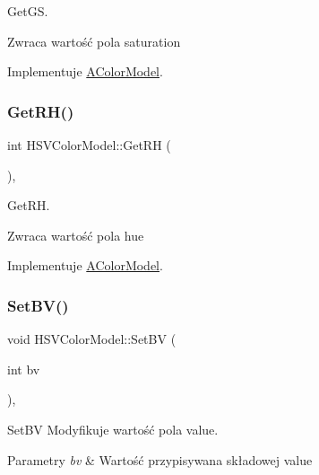 Get\+GS. 

\begin{DoxyReturn}{Zwraca}
wartość pola saturation 
\end{DoxyReturn}


Implementuje \mbox{\hyperlink{class_a_color_model}{A\+Color\+Model}}.

\mbox{\label{class_h_s_v_color_model_aeb9fd06a7806c227ee6a8ad85ee9fbf8}} 
\subsubsection{\texorpdfstring{Get\+R\+H()}{GetRH()}}
{\footnotesize\ttfamily int H\+S\+V\+Color\+Model\+::\+Get\+RH (\begin{DoxyParamCaption}{ }\end{DoxyParamCaption})\hspace{0.3cm}{\ttfamily [override]}, {\ttfamily [virtual]}}



Get\+RH. 

\begin{DoxyReturn}{Zwraca}
wartość pola hue 
\end{DoxyReturn}


Implementuje \mbox{\hyperlink{class_a_color_model}{A\+Color\+Model}}.

\mbox{\label{class_h_s_v_color_model_a4213b3b016d213e791b97438e62c9c1f}} 
\subsubsection{\texorpdfstring{Set\+B\+V()}{SetBV()}}
{\footnotesize\ttfamily void H\+S\+V\+Color\+Model\+::\+Set\+BV (\begin{DoxyParamCaption}\item[{int}]{bv }\end{DoxyParamCaption})\hspace{0.3cm}{\ttfamily [override]}, {\ttfamily [virtual]}}



Set\+BV Modyfikuje wartość pola value. 


\begin{DoxyParams}{Parametry}
{\em bv} & Wartość przypisywana składowej value \\
\hline
\end{DoxyParams}



